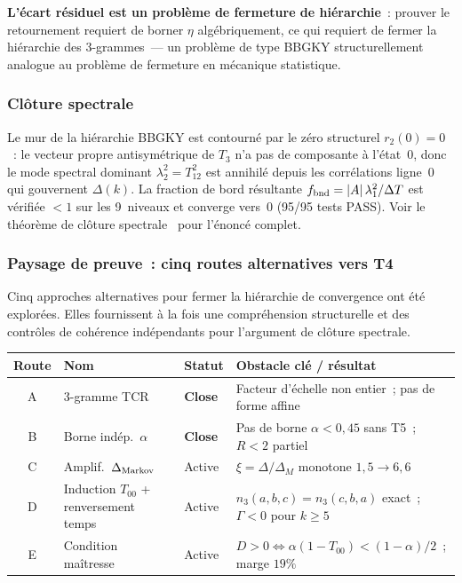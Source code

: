 \documentclass[12pt,a4paper]{article}
\begin{document}
\textbf{L'écart résiduel est un problème de fermeture de
hiérarchie}~: prouver le retournement requiert de borner $\eta$
algébriquement, ce qui requiert de fermer la hiérarchie des
3-grammes~--- un problème de type BBGKY structurellement analogue au
problème de fermeture en mécanique statistique.

\subsubsection{Clôture spectrale}

Le mur de la hiérarchie BBGKY est contourné par le zéro structurel
$r_2(0) = 0$~: le vecteur propre antisymétrique de $T_3$ n'a pas de
composante à l'état~$0$, donc le mode spectral dominant
$\lambda_2^2 = T_{12}^2$ est annihilé depuis les corrélations
ligne~$0$ qui gouvernent $\Delta(k)$. La fraction de bord résultante
$f_{\rm bnd} = |A|\,\lambda_1^2/\Delta T$ est vérifiée $< 1$ sur les
9~niveaux et converge vers~$0$ (95/95 tests PASS).
Voir le théorème de clôture spectrale~\cite{companion_M3} pour
l'énoncé complet.

\subsubsection{Paysage de preuve~: cinq routes alternatives vers T4}
\label{sec:ch7b_five_routes}

Cinq approches alternatives pour fermer la hiérarchie de convergence
ont été explorées. Elles fournissent à la fois une compréhension
structurelle et des contrôles de cohérence indépendants pour
l'argument de clôture spectrale.

\begin{center}
\begin{tabular}{clll}
\toprule
\textbf{Route} & \textbf{Nom} & \textbf{Statut} & \textbf{Obstacle clé / résultat} \\
\midrule
A & 3-gramme TCR & \textbf{Close} & Facteur d'échelle non entier~; pas de forme affine \\
B & Borne indép.\ $\alpha$ & \textbf{Close} & Pas de borne $\alpha < 0{,}45$ sans T5~; $R < 2$ partiel \\
C & Amplif.\ $\Delta_{\rm Markov}$ & Active & $\xi = \Delta/\Delta_M$ monotone $1{,}5 \to 6{,}6$ \\
D & Induction $T_{00}$ + renversement temps & Active & $n_3(a,b,c) = n_3(c,b,a)$ exact~; $\Gamma < 0$ pour $k \geq 5$ \\
E & Condition maîtresse & Active & $D > 0 \Leftrightarrow \alpha(1-T_{00}) < (1-\alpha)/2$~; marge $19\%$ \\
\bottomrule
\end{tabular}
\end{center}
\end{document}

